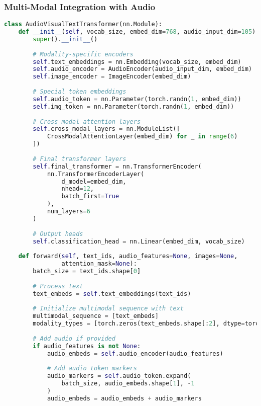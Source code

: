\subsubsection{Multi-Modal Integration with Audio}

\begin{lstlisting}[language=Python, caption=Multimodal transformer with audio token integration]
class AudioVisualTextTransformer(nn.Module):
    def __init__(self, vocab_size, embed_dim=768, audio_input_dim=105):
        super().__init__()
        
        # Modality-specific encoders
        self.text_embeddings = nn.Embedding(vocab_size, embed_dim)
        self.audio_encoder = AudioEncoder(audio_input_dim, embed_dim)
        self.image_encoder = ImageEncoder(embed_dim)
        
        # Special token embeddings
        self.audio_token = nn.Parameter(torch.randn(1, embed_dim))
        self.img_token = nn.Parameter(torch.randn(1, embed_dim))
        
        # Cross-modal attention layers
        self.cross_modal_layers = nn.ModuleList([
            CrossModalAttentionLayer(embed_dim) for _ in range(6)
        ])
        
        # Final transformer layers
        self.final_transformer = nn.TransformerEncoder(
            nn.TransformerEncoderLayer(
                d_model=embed_dim,
                nhead=12,
                batch_first=True
            ),
            num_layers=6
        )
        
        # Output heads
        self.classification_head = nn.Linear(embed_dim, vocab_size)
    
    def forward(self, text_ids, audio_features=None, images=None, 
                attention_mask=None):
        batch_size = text_ids.shape[0]
        
        # Process text
        text_embeds = self.text_embeddings(text_ids)
        
        # Initialize multimodal sequence with text
        multimodal_sequence = [text_embeds]
        modality_types = [torch.zeros(text_embeds.shape[:2], dtype=torch.long)]
        
        # Add audio if provided
        if audio_features is not None:
            audio_embeds = self.audio_encoder(audio_features)
            
            # Add audio token markers
            audio_markers = self.audio_token.expand(
                batch_size, audio_embeds.shape[1], -1
            )
            audio_embeds = audio_embeds + audio_markers
            

\end{lstlisting}
